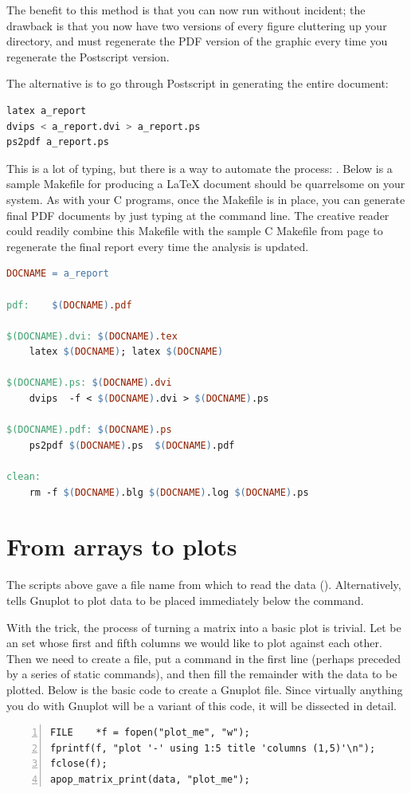 The benefit to this method is that you can now run  without incident; the drawback is that you now have two
versions of every figure cluttering up your directory, and must
regenerate the PDF version of the graphic every time you regenerate the Postscript
version.

The alternative is to go through Postscript in generating the entire
document:
\begin{lstlisting}[language=sql]
latex a_report
dvips < a_report.dvi > a_report.ps
ps2pdf a_report.ps
\end{lstlisting}

This is a lot of typing, but there is a way to automate the process:
. Below is a sample Makefile for producing a \LaTeX{} document
should  be quarrelsome on your system. As with your C
programs, once the Makefile is in place, you can generate final PDF
documents by just typing  at the command line. The
creative reader could readily combine this Makefile with the sample C
Makefile from page \pageref{make} to regenerate the final report every
time the analysis is updated.

\label{latexmake}
\begin{lstlisting}[language=make]
DOCNAME = a_report

pdf:	$(DOCNAME).pdf

$(DOCNAME).dvi: $(DOCNAME).tex
	latex $(DOCNAME); latex $(DOCNAME)

$(DOCNAME).ps: $(DOCNAME).dvi
	dvips  -f < $(DOCNAME).dvi > $(DOCNAME).ps

$(DOCNAME).pdf: $(DOCNAME).ps
	ps2pdf $(DOCNAME).ps  $(DOCNAME).pdf

clean:
	rm -f $(DOCNAME).blg $(DOCNAME).log $(DOCNAME).ps
\end{lstlisting}


\section{From arrays to plots} \label{gnuprint}
The scripts above gave a file name from which to read the data ().  Alternatively,  tells Gnuplot to
plot data to be placed immediately below the  command.

With
the  trick, the process of turning a matrix into a basic plot is
trivial. Let  be an  set whose first and fifth
columns we would like to plot against each other. Then we need to create
a file, put a  command in the first line (perhaps preceded by a series of 
static  commands), and then fill the
remainder with the data to be plotted. Below is the basic code to create
a Gnuplot file. Since virtually anything you do with Gnuplot will be a
variant of this code, it will be dissected in detail.  
  \label{fprintf}
\begin{lstlisting}[numbers=left, numberstyle=\scshape]
FILE    *f = fopen("plot_me", "w");
fprintf(f, "plot '-' using 1:5 title 'columns (1,5)'\n");
fclose(f);
apop_matrix_print(data, "plot_me");
\end{lstlisting}


